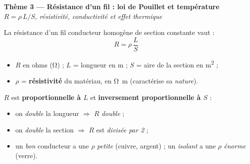 \documentclass[11pt,a4paper]{article}
\begin{document}
\usetikzlibrary{babel}

\begin{center}
{\LARGE\bfseries\color{primarydark} Thème 3 — Résistance d'un fil : loi de Pouillet et température}\\[2pt]
{\color{primary}\itshape $R=\rho\,L/S$, résistivité, conductivité et effet thermique}
\end{center}

\begin{cle}
La résistance d'un fil conducteur homogène de section constante vaut :
\[ \boxed{\;R=\rho\,\dfrac{L}{S}\;} \]
\begin{itemize}[leftmargin=1.5em,topsep=1pt,itemsep=0pt]
  \item $R$ en ohms (\si{\ohm}) ; \quad $L$ = longueur en \si{\metre} ; \quad $S$ = aire de la section
        en \si{\metre\squared} ;
  \item $\rho$ = \textbf{résistivité} du matériau, en \si{\ohm\metre} (caractérise sa \emph{nature}).
\end{itemize}
\end{cle}

\begin{center}
\end{center}

\begin{cle}
$R$ est \textbf{proportionnelle à $L$} et \textbf{inversement proportionnelle à $S$} :
\begin{itemize}[leftmargin=1.5em,topsep=1pt,itemsep=0pt]
  \item on \emph{double} la longueur $\Rightarrow$ $R$ \emph{double} ;
  \item on \emph{double} la section $\Rightarrow$ $R$ est \emph{divisée par 2} ;
  \item un \emph{bon} conducteur a une $\rho$ \emph{petite} (cuivre, argent) ; un \emph{isolant} a une
        $\rho$ \emph{énorme} (verre).
\end{itemize}
\end{cle}
\end{document}
